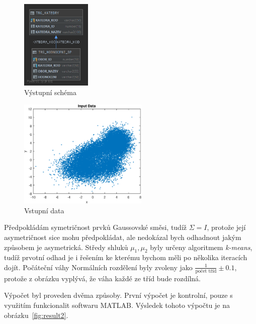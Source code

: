 \begin{figure}[htb]
    \centering
    \includegraphics[width=0.3\textwidth]{graphs/trg-model.png}
    \caption{Výstupní schéma}
    \label{fig:trg-model}
\end{figure}
\FloatBarrier

\begin{figure}[htb]
    \centering
    \includegraphics[width=0.55\textwidth]{graphs/fig1.eps}
    \caption{Vstupní data}
    \label{fig:result1}
\end{figure}
\FloatBarrier

Předpokládám symetričnost prvků Gaussovské směsi, tudíž \( \Sigma = I \), protože její asymetričnost sice mohu předpokládat, ale nedokázal bych odhadnout jakým způsobem je asymetrická.
Středy shluků \( \mu_1, \mu_2 \) byly určeny algoritmem \textit{k-means}, tudíž prvotní odhad je i řešením ke kterému bychom měli po několika iteracích dojít.
Počáteční váhy Normálních rozdělení byly zvoleny jako \( \frac{1}{\text{počet tříd}} \pm 0.1 \), protože z obrázku vyplývá, že váha každé ze tříd bude rozdílná.

Výpočet byl proveden dvěma způsoby.
První výpočet je kontrolní, pouze s využitím funkcionalit softwaru MATLAB.
Výsledek tohoto výpočtu je na obrázku~\ref{fig:result2}.

